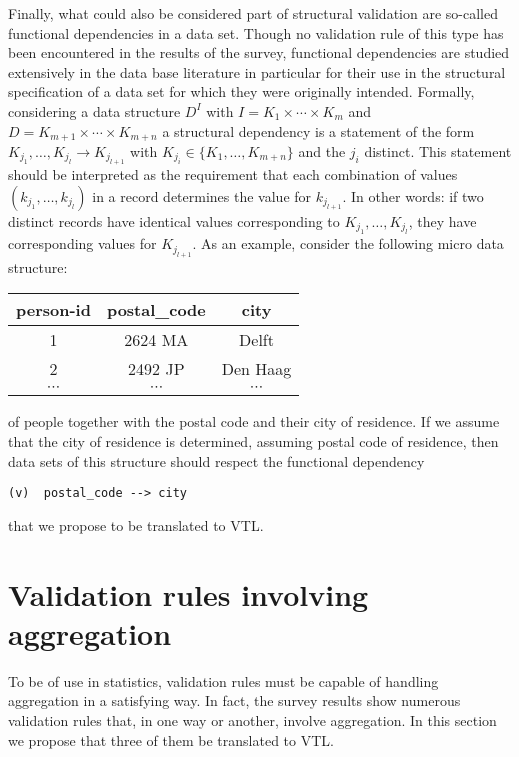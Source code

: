 Finally, what could also be considered part of structural validation are so-called functional dependencies in a data set. Though no validation rule of this type has been encountered in the results of the survey, functional dependencies are studied extensively in the data base literature \cite{abiteboul} in particular for their use in the structural specification of a data set \cite{armstrong} for which they were originally intended. Formally, considering a data structure $D^I$ with $I=K_1\times\cdots\times K_m$ and $D=K_{m+1}\times\cdots\times K_{m+n}$ a structural dependency is a statement of the form $K_{j_1},\dots,K_{j_l}\to K_{j_{l+1}}$ with $K_{j_i}\in\{K_1,\dots,K_{m+n}\}$ and the $j_i$ distinct. This statement should be interpreted as the requirement that each combination of values $(k_{j_1},\dots,k_{j_l})$ in a record determines the value for $k_{j_{l+1}}$. In other words: if two distinct records have identical values corresponding to $K_{j_1},\dots,K_{j_l}$, they have corresponding values for $K_{j_{l+1}}$. As an example, consider the following micro data structure:
\begin{center}
\begin{tabular}[c]{|c|c|c|}
\hline
person-id & postal\_code & city \\
\hline
\hline
1 & 2624 MA & Delft\\
\hline
2 & 2492 JP & Den Haag\\
\hline
$\cdots$ & $\cdots$ & $\cdots$\\
\hline
\end{tabular}
\end{center}
of people together with the postal code and their city of residence. If we assume that the city of residence is determined, assuming postal code of residence, then data sets of this structure should respect the functional dependency
\begin{verbatim}
(v)  postal_code --> city
\end{verbatim}
that we propose to be translated to VTL.

\section{Validation rules involving aggregation}
To be of use in statistics, validation rules must be capable of handling aggregation in a satisfying way. In fact, the survey results show numerous validation rules that, in one way or another, involve aggregation. In this section we propose that three of them be translated to VTL.

